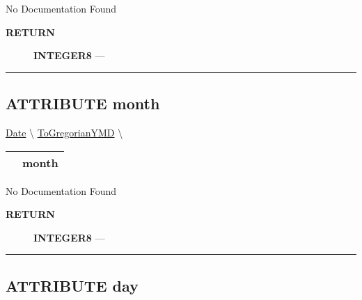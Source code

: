 \par





No Documentation Found








\par
\begin{description}
\item [\colorbox{tagtype}{\color{white} \textbf{\textsf{RETURN}}}] \textbf{INTEGER8} --- 
\end{description}




\rule{\linewidth}{0.5pt}
\subsection*{\textsf{\colorbox{headtoc}{\color{white} ATTRIBUTE}
month}}

\hypertarget{ecldoc:date.togregorianymd.result.month}{}
\hspace{0pt} \hyperlink{ecldoc:Date}{Date} \textbackslash 
\hspace{0pt} \hyperlink{ecldoc:date.togregorianymd}{ToGregorianYMD} \textbackslash 

{\renewcommand{\arraystretch}{1.5}
\begin{tabularx}{\textwidth}{|>{\raggedright\arraybackslash}l|X|}
\hline
\hspace{0pt}\mytexttt{\color{red} } & \textbf{month} \\
\hline
\end{tabularx}
}

\par





No Documentation Found








\par
\begin{description}
\item [\colorbox{tagtype}{\color{white} \textbf{\textsf{RETURN}}}] \textbf{INTEGER8} --- 
\end{description}




\rule{\linewidth}{0.5pt}
\subsection*{\textsf{\colorbox{headtoc}{\color{white} ATTRIBUTE}
day}}


